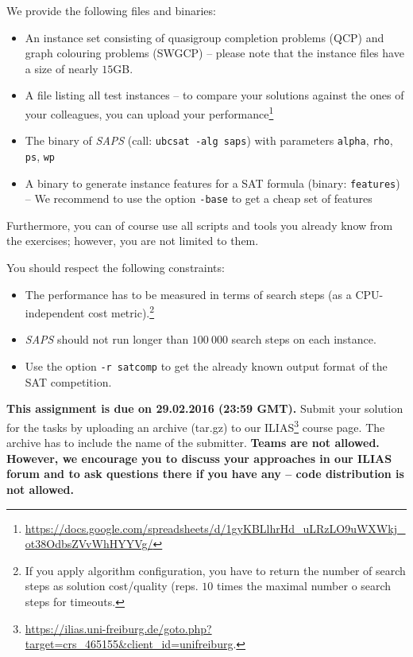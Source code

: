\documentclass{exam}
\newcommand{\note}[1]{
	\noindent~\\
	\vspace{0.25cm}
	\fcolorbox{Red}{Orange}{\parbox{0.99\textwidth}{#1\\}}
	\vspace{0.25cm}
}
\begin{document}
\begin{questions}
We provide the following files and binaries:

\begin{itemize}
  \item An instance set consisting of quasigroup completion problems (QCP) and graph colouring problems (SWGCP) -- please note that the instance files have a size of nearly $15$GB.
  \item A file listing all test instances -- to compare your solutions against the ones of your colleagues, you can upload your performance\footnote{\url{https://docs.google.com/spreadsheets/d/1gyKBLlhrHd_uLRzLO9uWXWkj_ot38OdbsZVvWhHYYVg/}} 
  \item The binary of \textit{SAPS} (call: \texttt{ubcsat -alg saps}) with parameters \texttt{alpha}, \texttt{rho}, \texttt{ps}, \texttt{wp}
  \item A binary to generate instance features for a SAT formula (binary: \texttt{features}) -- We recommend to use the option \texttt{-base} to get a cheap set of features
\end{itemize}

 
Furthermore, you can of course use all scripts and tools you already know from the exercises; however, you are not limited to them.

You should respect the following constraints:

\begin{itemize}
  \item The performance has to be measured in terms of search steps (as a CPU-independent cost metric).\footnote{If you apply algorithm configuration, you have to return the number of search steps as solution cost/quality (reps. $10$ times the maximal number o search steps for timeouts.}
  \item \textit{SAPS} should not run longer than $100\ 000$ search steps on each instance.
  \item Use the option \texttt{-r satcomp} to get the already known output format of the SAT competition.
\end{itemize}

\end{questions}

\noindent
{\bf This assignment is due on 29.02.2016 (23:59 GMT).} Submit your solution for the tasks by uploading an archive (tar.gz) to our ILIAS\footnote{ \url{https://ilias.uni-freiburg.de/goto.php?target=crs_465155&client_id=unifreiburg}.} course page. The archive has to include the name of the submitter. \textbf{Teams are not allowed. 
However, we encourage you to discuss your approaches in our ILIAS forum and to ask questions there if you have any -- code distribution is not allowed.}
\end{document}
